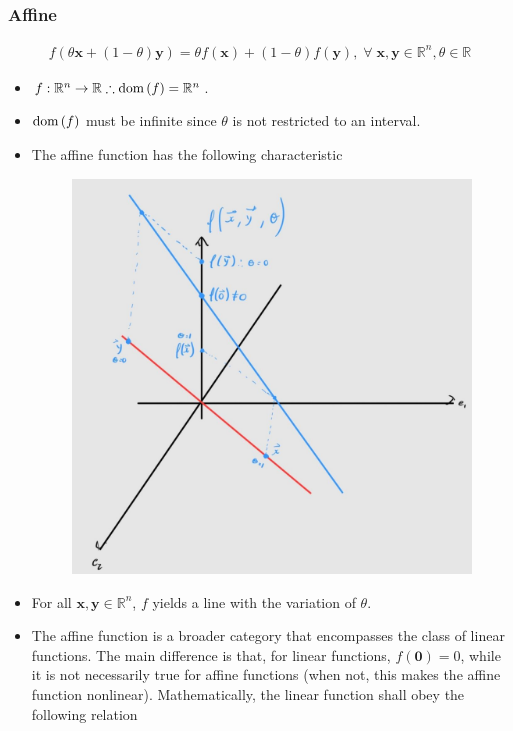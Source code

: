 \documentclass{article}
\newcommand{\dom}[1]{\ensuremath{\textnormal{dom}\left(#1\right)}} %
\begin{document}
\subsubsection{Affine}
\begin{align}
	f(\theta \mathbf{x} + (1-\theta)\mathbf{y}) = \theta f(\mathbf{x}) + (1-\theta)f(\mathbf{y}),\;\forall\; \mathbf{x}, \mathbf{y} \in \mathbb{R}^{n}, \theta\in\mathbb{R}
\end{align}
\begin{itemize}
	\item \(f: \mathbb{R}^{n} \rightarrow \mathbb{R} \therefore \dom{f} = \mathbb{R}^{n}\).
	\item \(\dom{f}\) must be infinite since \(\theta\) is not restricted to an interval.
	\item The affine function has the following characteristic
	      \begin{figure}[H]
		      \centering
		      \includegraphics[scale=.2]{figs/affine.png}
	      \end{figure}
	\item For all \(\mathbf{x}, \mathbf{y} \in \mathbb{R}^{n}\), \(f\) yields a line with the variation of \(\theta\).
	\item The affine function is a broader category that encompasses the class of linear functions. The main difference is that, for linear functions, \(f(\mathbf{0}) = 0\), while it is not necessarily true for affine functions (when not, this makes the affine function nonlinear). Mathematically, the linear function shall obey the following relation

\end{itemize}
\end{document}
